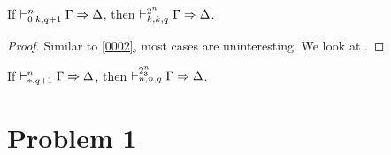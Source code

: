 \documentclass[a4paper]{article}
\begin{document}
\begin{lemma}\label{0005}
  If $\mathrel{\vdash^{n}_{0,k,q+1}} \Gamma \Rightarrow \Delta$, then $\mathrel{\vdash^{2^n}_{k,k,q}} \Gamma \Rightarrow \Delta$.
\end{lemma}
\begin{proof}
  Similar to \cref{0002}, most cases are uninteresting.
  We look at \rCut.
\end{proof}

\begin{corollary}\label{0007}
  If $\mathrel{\vdash^{n}_{\mathord{*},q + 1}} \Gamma \Rightarrow \Delta$, then $\mathrel{\vdash^{2^n_3}_{n,n,q}} \Gamma \Rightarrow \Delta$.
\end{corollary}

\section*{Problem 1}
\label{0001}

% 
% 
\end{document}
